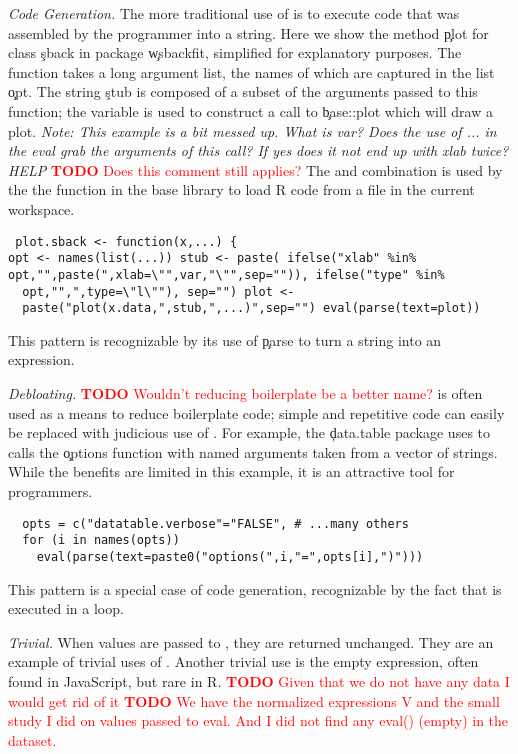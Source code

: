 \documentclass[review,nonacm,screen,acmsmall,anonymous=true]{acmart}
\newcommand{\mypara}[1]{\medskip\noindent\emph{#1}\xspace}
\newcommand{\NOTE}[1]{{\it Note: #1}\xspace}
\newcommand{\authorcomment}[3]{\xspace\textcolor{#1}{{\bf #2} #3}\xspace}
\newcommand{\todo}[1]{\authorcomment{red}{TODO}{#1}}
\begin{document}
\mypara{Code Generation.} The more traditional use of \eval is to execute code
that was assembled by the programmer into a string. Here we show the method
\c{plot} for class \c{sback} in package \c{wsbackfit}, simplified for
explanatory purposes. The function takes a long argument list, the names of
which are captured in the list \c{opt}. The string \c{stub} is composed of a
subset of the arguments passed to this function; the variable is used to
construct a call to \c{base::plot} which will draw a plot. \NOTE{This example
  is a bit messed up. What is var? Does the use of ... in the eval grab the
arguments of this call? If yes does it not end up with xlab twice? HELP}
\todo{Does this comment still applies?} The \parse and \eval combination is
used by the the \source function in the base library to load R code from a file
in the current workspace.  \begin{lstlisting} plot.sback <- function(x,...) {
opt <- names(list(...)) stub <- paste( ifelse("xlab" %in%
opt,"",paste(",xlab=\"",var,"\"",sep="")), ifelse("type" %in%
  opt,"",",type=\"l\""), sep="") plot <-
  paste("plot(x.data,",stub,",...)",sep="") eval(parse(text=plot))
  \end{lstlisting} This pattern is recognizable by its use of \c{parse} to turn
  a string into an expression.


\mypara{Debloating.} \todo{Wouldn't reducing boilerplate be a better name?} \Eval is often used as a means to reduce boilerplate code;
simple and repetitive code can easily be replaced with judicious use of \eval.
For example, the \c{data.table} package uses \eval to calls the \c{options}
function with named arguments taken from a vector of strings. While the benefits
are limited in this example, it is an attractive tool for programmers.
\begin{lstlisting}
  opts = c("datatable.verbose"="FALSE", # ...many others
  for (i in names(opts))
    eval(parse(text=paste0("options(",i,"=",opts[i],")")))
\end{lstlisting}
This pattern is a special case of code generation, recognizable by the
fact that \eval is executed in a loop.

\mypara{Trivial.} When values are passed to \eval, they are returned
unchanged. They are an example of trivial uses of \eval. Another
trivial use is the empty expression, often found in JavaScript, but
rare in R. \todo{Given that we do not have any data I would get rid of it}
\todo{We have the normalized expressions V and the small study I did on values passed to eval. And I did not find any eval() (empty) in the dataset. }
\end{document}
